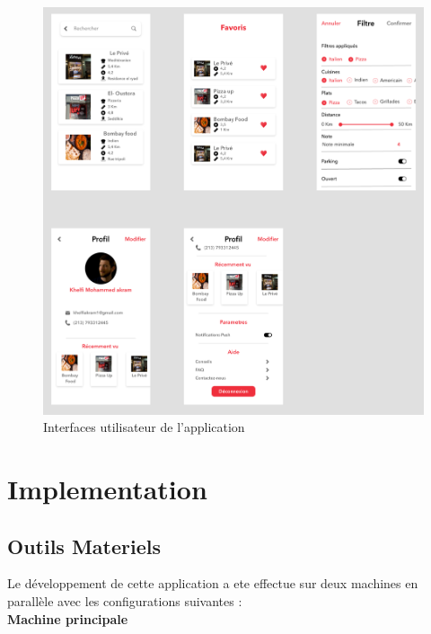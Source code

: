 \newpage
\begin{figure}[!h]

    \centering
    \includegraphics[width=6.5in]{images/Chapitre3/maquettes_balsamiq/p3.jpg}
    \caption{Interfaces utilisateur de l'application}

    \label{fig:ux3}
   
\end{figure}
\newpage
\section{Implementation}
\subsection{Outils Materiels}
Le développement de cette application a ete effectue sur deux machines en parallèle avec les configurations suivantes :
\\
\textbf{Machine principale}

